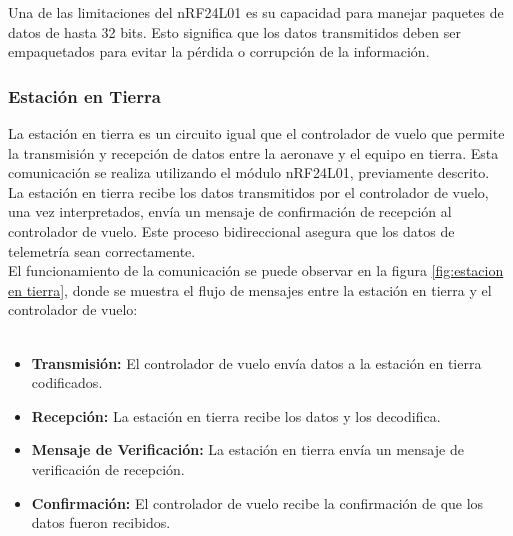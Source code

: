         Una de las limitaciones del nRF24L01 es su capacidad para manejar paquetes de datos de hasta 32 bits. Esto significa que los datos transmitidos deben ser empaquetados para evitar la pérdida o corrupción de la información.

    \subsubsection{Estación en Tierra }

        La estación en tierra es un circuito igual que el controlador de vuelo que permite la transmisión y recepción de datos entre la aeronave y el equipo en tierra. Esta comunicación se realiza utilizando el módulo nRF24L01, previamente descrito. \\


        La estación en tierra recibe los datos transmitidos por el controlador de vuelo, una vez interpretados, envía un mensaje de confirmación de recepción al controlador de vuelo. Este proceso bidireccional asegura que los datos de telemetría sean correctamente. \\

        El funcionamiento de la comunicación se puede observar en la figura \ref{fig:estacion en tierra}, donde se muestra el flujo de mensajes entre la estación en tierra y el controlador de vuelo: \\ \\ 

        \begin{itemize}
            \item \textbf{Transmisión:} El controlador de vuelo envía datos a la estación en tierra codificados.
            \item \textbf{Recepción:} La estación en tierra recibe los datos y los decodifica.
            \item \textbf{Mensaje de Verificación:} La estación en tierra envía un mensaje de verificación de recepción.
            \item \textbf{Confirmación:} El controlador de vuelo recibe la confirmación de que los datos fueron recibidos.
        \end{itemize}

